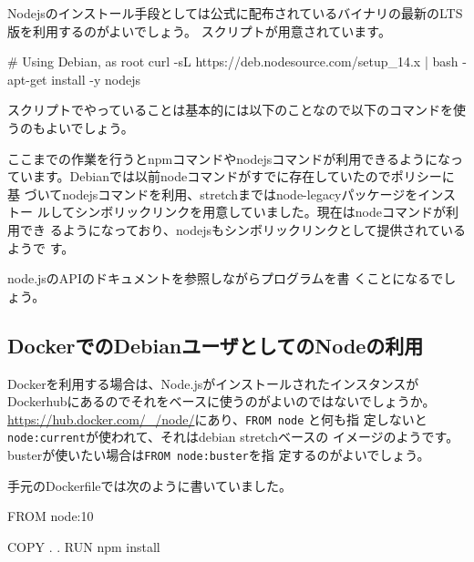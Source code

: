 \documentclass[mingoth,a4paper]{jsarticle}
\begin{document}
Nodejsのインストール手段としては公式に配布されているバイナリの最新のLTS
版を利用するのがよいでしょう\cite{nodejs-install}。
スクリプトが用意されています。

\begin{commandline}
# Using Debian, as root
curl -sL https://deb.nodesource.com/setup_14.x | bash -
apt-get install -y nodejs
\end{commandline}

スクリプトでやっていることは基本的には以下のことなので以下のコマンドを使うのもよいでしょう。


ここまでの作業を行うとnpmコマンドやnodejsコマンドが利用できるようになっ
ています。Debianでは以前nodeコマンドがすでに存在していたのでポリシーに基
づいてnodejsコマンドを利用、stretchまではnode-legacyパッケージをインストー
ルしてシンボリックリンクを用意していました。現在はnodeコマンドが利用でき
るようになっており、nodejsもシンボリックリンクとして提供されているようで
す。

node.jsのAPIのドキュメント\cite{nodejs-api}を参照しながらプログラムを書
くことになるでしょう。


\subsection{DockerでのDebianユーザとしてのNodeの利用}

Dockerを利用する場合は、Node.jsがインストールされたインスタンスが
Dockerhubにあるのでそれをベースに使うのがよいのではないでしょうか。
\url{https://hub.docker.com/_/node/}にあり、\texttt{FROM node} と何も指
定しないと\texttt{node:current}が使われて、それはdebian stretchベースの
イメージのようです。busterが使いたい場合は\texttt{FROM node:buster}を指
定するのがよいでしょう。

手元のDockerfileでは次のように書いていました。

\begin{commandline}
FROM node:10

COPY . .
RUN npm install
\end{commandline}
\end{document}

